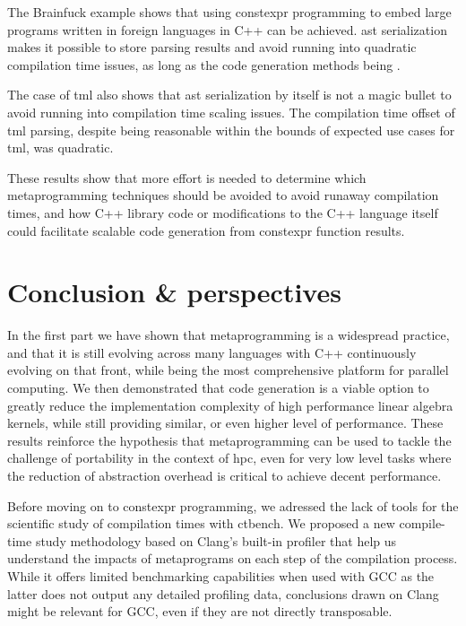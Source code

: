 \documentclass[english,12pt,a4paper]{book}
\providecommand{\cpp}{\textsc{C++}\xspace}
\begin{document}
The Brainfuck example shows that using \gls{constexpr} programming to embed
large programs written in foreign languages in \cpp can be achieved.
\gls{ast} serialization makes it possible to store parsing results
and avoid running into quadratic compilation time issues, as long as
the code generation methods being .

The case of \gls{tml} also shows that \gls{ast} serialization
by itself is not a magic bullet to avoid running into compilation time
scaling issues.
The compilation time offset of \gls{tml} parsing, despite being reasonable
within the bounds of expected use cases for \gls{tml}, was quadratic.

These results show that more effort is needed to determine which metaprogramming
techniques should be avoided to avoid runaway compilation times,
and how \cpp library code or modifications to the \cpp language itself
could facilitate scalable code generation from \gls{constexpr} function results.

\chapter*{Conclusion \& perspectives}

In the first part we have shown that metaprogramming is a widespread practice,
and that it is still evolving across many languages with \cpp continuously
evolving on that front, while being the most comprehensive platform for
parallel computing.
We then demonstrated that code generation is a viable option to greatly reduce
the implementation complexity of high performance linear algebra kernels,
while still providing similar, or even higher level of performance.
These results reinforce the hypothesis that metaprogramming can be used to
tackle the challenge of portability in the context of \acrlong{hpc},
even for very low level tasks where the reduction of abstraction overhead
is critical to achieve decent performance.

Before moving on to \gls{constexpr} programming, we adressed the lack of
tools for the scientific study of compilation times with ctbench.
We proposed a new compile-time study methodology based on Clang's built-in
profiler that help us understand the impacts of metaprograms on each step
of the compilation process. While it offers limited benchmarking capabilities
when used with GCC as the latter does not output any detailed profiling data,
conclusions drawn on Clang might be relevant for GCC, even if they are not
directly transposable.
\end{document}
